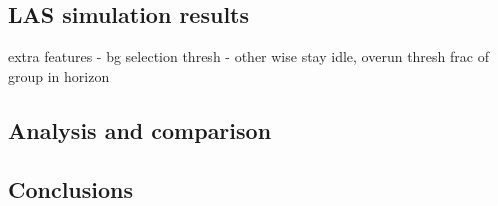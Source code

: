 \subsection{LAS simulation results}
extra features - bg selection thresh - other wise stay idle, overun thresh frac of group in horizon


\subsection{Analysis and comparison}

\subsection{Conclusions}
